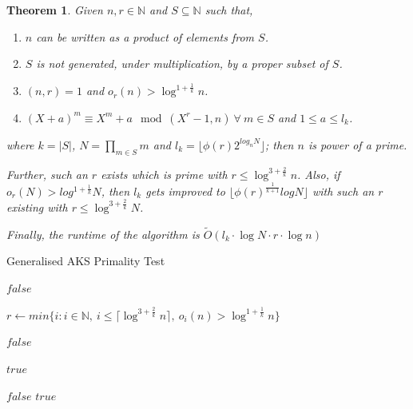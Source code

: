\documentclass[11pt]{report}
\newtheorem{theorem}{Theorem}[section]
\begin{document}
\begin{theorem}
\label{theorem:GeneralisedAKS}
Given $n, r \in \mathbb{N}$ and $S \subseteq \mathbb{N}$ such that,
\begin{enumerate}[1.]
\item $n$ can be written as a product of elements from $S$.
\item $S$ is not generated, under multiplication, by a proper subset of $S$.
\item $(n, r) = 1$ and $o_r(n) > \log^{1 + \frac 1 {k}} n$.
\item $(X+a)^m \equiv X^m + a \mod (X^r-1, n)\ \forall \ m \in S$ and $1 \leq a \leq l_k$.
\end{enumerate}
where $k = |S|$, $\displaystyle N = \prod_{m \in S} m$ and $l_k = \lfloor \phi(r)2^{log_n N}\rfloor$; then $n$ is power of a prime. 

Further, such an $r$ exists which is prime with $r \leq \log^{3 + \frac{2}{k}} n$. Also, if $o_r(N) > log^{1 + \frac{1}{k}} N$, then $l_k$ gets improved to $\lfloor \phi(r)^\frac{1}{k+1} log N \rfloor$ with such an $r$ existing with $r \leq \log^{3 + \frac{2}{k}} N$.

Finally, the runtime of the algorithm is $\tilde O(l_k \cdot \log N \cdot r \cdot \log n)$
\end{theorem}

\begin{algorithm}
\caption{Generalised AKS Primality Test}
\label{alg:GeneralisedAKSPrimalityTest}
\begin{algorithmic}

	\State \Return $false$  
\EndIf

\State $r \gets min \{i: i \in \mathbb{N},\ i \leq \lceil \log^{3+\frac{2}{k}} n \rceil,\ o_i(n) > \log^{1+\frac{1}{k}} n \}$ 

		\State \Return $false$  
	\EndIf
\EndFor

	\Return $true$  
\EndIf

			\State \Return $false$  
		\EndIf
	\EndFor
\EndFor
\State \Return $true$ 
\EndProcedure
\end{algorithmic}
\end{algorithm}
\end{document}
